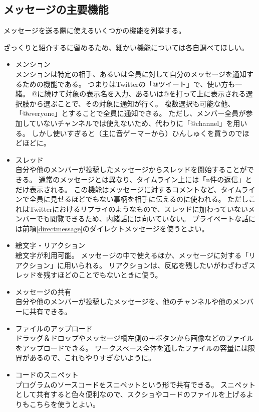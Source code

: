 \documentclass[lualatex,ja=standard,12pt,a4j]{bxjsbook}
\begin{document}
            \subsection{メッセージの主要機能}
            	メッセージを送る際に使えるいくつかの機能を列挙する。
                
                ざっくりと紹介するに留めるため、細かい機能については各自調べてほしい。
                
                \begin{itemize}
                	\item メンション\\
                    	メンションは特定の相手、あるいは全員に対して自分のメッセージを通知するための機能である。
                        つまりはTwitterの「@ツイート」で、使い方も一緒。
                        @に続けて対象の表示名を入力、あるいは@を打って上に表示される選択肢から選ぶことで、その対象に通知が行く。
                        複数選択も可能な他、「@everyone」とすることで全員に通知できる。
                        ただし、メンバー全員が参加していないチャンネルでは使えないため、代わりに「@channel」を用いる。
                        しかし使いすぎると（主に音ゲーマーから）ひんしゅくを買うのでほどほどに。
                    \item スレッド\\
                    	自分や他のメンバーが投稿したメッセージからスレッドを開始することができる。
                        通常のメッセージとは異なり、タイムライン上には「n件の返信」とだけ表示される。
                        この機能はメッセージに対するコメントなど、タイムラインで全員に見せるほどでもない事柄を相手に伝えるのに使われる。
                        ただしこれはTwitterにおけるリプライのようなもので、スレッドに加わっていないメンバーでも閲覧できるため、内緒話には向いていない。
                        プライベートな話には前項\ref{directmessage}のダイレクトメッセージを使うとよい。
                    \item 絵文字・リアクション\\
                    	絵文字が利用可能。
                        メッセージの中で使えるほか、メッセージに対する「リアクション」に用いられる。
                        リアクションは、反応を残したいがわざわざスレッドを残すほどのことでもないときに使う。
                    \item メッセージの共有\\
                    	自分や他のメンバーが投稿したメッセージを、他のチャンネルや他のメンバーに共有できる。
                    \item ファイルのアップロード\\
                    	ドラッグ＆ドロップやメッセージ欄左側の＋ボタンから画像などのファイルをアップロードできる。
                        ワークスペース全体を通したファイルの容量には限界があるので、これもやりすぎないように。
                    \item コードのスニペット\\
                    	プログラムのソースコードをスニペットという形で共有できる。
                        スニペットとして共有すると色々便利なので、スクショやコードのファイルを上げるよりもこちらを使うとよい。
                \end{itemize}
\end{document}
